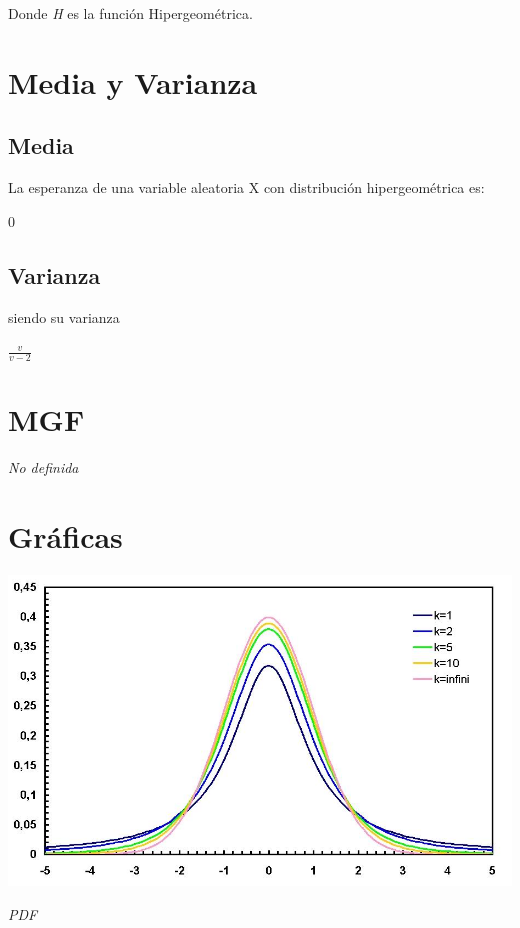 Donde \textit{H} es la función Hipergeométrica.

\section{Media y Varianza}
\subsection{Media}
La esperanza de una variable aleatoria X con distribución hipergeométrica es:
\begin{center}
	$0$
\end{center}

\subsection{Varianza}
siendo su varianza
\begin{center}
	$\frac{v}{v-2}$
\end{center}

\section{MGF}
\textit{No definida}

\section{Gráficas}

\begin{center}	
	\includegraphics[scale=0.5]{imgs/t-pdf.jpeg}
	
	\textit{PDF}
\end{center}

